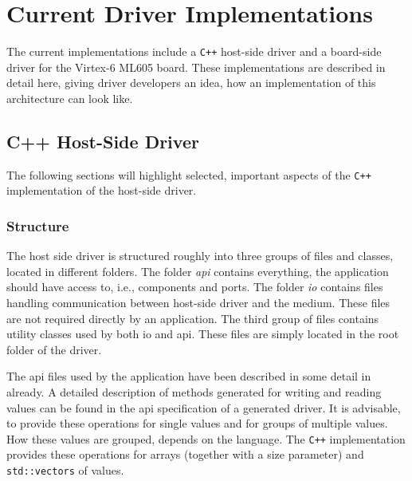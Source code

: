\documentclass{report}
\begin{document}
\section{Current Driver Implementations}
\label{sec:impl}
The current implementations include a \texttt{C++} host-side driver and a board-side driver for the Virtex-6 ML605 board. These implementations are described in detail here, giving driver developers an idea, how an implementation of this architecture can look like. 


\subsection{C++ Host-Side Driver}
\label{sec:impl:cpp}
The following sections will highlight selected, important aspects of the \texttt{C++} implementation of the host-side driver.

\subsubsection{Structure}
The host side driver is structured roughly into three groups of files and classes, located in different folders. The folder \textit{api} contains everything, the application should have access to, i.e., components and ports. The folder \textit{io} contains files handling communication between host-side driver and the medium. These files are not required directly by an application. The third group of files contains utility classes used by both io and api. These files are simply located in the root folder of the driver.

The api files used by the application have been described in some detail in  already. A detailed description of methods generated for writing and reading values can be found in the api specification of a generated driver. It is advisable, to provide these operations for single values and for groups of multiple values. How these values are grouped, depends on the language. The \texttt{C++} implementation provides these operations for arrays (together with a size parameter) and \texttt{std::vectors} of values.
\end{document}

